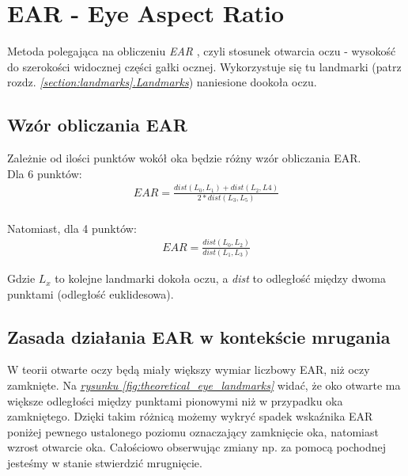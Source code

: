 \newpage

\section{EAR - Eye Aspect Ratio}
Metoda polegająca na obliczeniu \textit{EAR}  \cite{EARRaspberryPi} \cite{eyeBlinkEARRosebrock}, czyli stosunek otwarcia oczu - wysokość do szerokości widocznej części gałki ocznej. Wykorzystuje się tu landmarki (patrz rozdz. \hyperref[{section:landmarks}]{\textit{\ref{section:landmarks}.Landmarks}}) naniesione dookoła oczu.

\subsection{Wzór obliczania EAR}
Zależnie od ilości punktów wokół oka będzie różny wzór obliczania EAR.\\
Dla 6 punktów:
\begin{align}
    EAR = \frac{dist(L_0, L_1) + dist(L_2, L4)}{2 * dist(L_3, L_5)}
\end{align}
\\
Natomiast, dla 4 punktów:
\begin{align}
    EAR = \frac{dist(L_0, L_2)}{dist(L_1, L_3)}
\end{align}

Gdzie \textit{$L_x$} to kolejne landmarki dokoła oczu, a \textit{dist} to odległość między dwoma punktami (odległość euklidesowa).\\

\subsection{Zasada działania EAR w kontekście mrugania}

W teorii otwarte oczy będą miały większy wymiar liczbowy EAR, niż oczy zamknięte. Na \hyperref[{fig:theoretical_eye_landmarks}]{\textit{rysunku \ref{fig:theoretical_eye_landmarks}}} widać, że oko otwarte ma większe odległości między punktami pionowymi niż w przypadku  oka zamkniętego. Dzięki takim różnicą możemy wykryć spadek wskaźnika EAR poniżej pewnego ustalonego poziomu oznaczający zamknięcie oka, natomiast wzrost otwarcie oka. Całościowo obserwując zmiany np. za pomocą pochodnej jesteśmy w stanie stwierdzić mrugnięcie.

